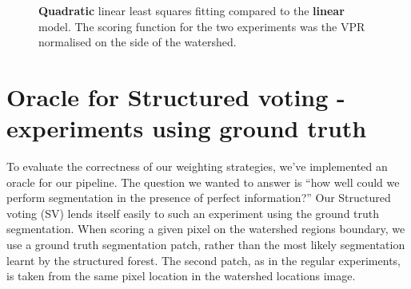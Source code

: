 \begin{figure}[ht!]
\centering
\caption[Quadratic linear least squares fitting compared to the linear model - plots]{{\bf Quadratic} linear least squares fitting compared to the {\bf linear} model. The scoring function for the two experiments was the VPR normalised on the side of the watershed.}
\label{fig:SE-quadratic}
\end{figure}

\section[Oracle for Structured voting]{Oracle for Structured voting - experiments using ground truth}
\label{sec:ch5-oracle}

To evaluate the correctness of our weighting strategies, we've implemented an oracle for our pipeline. The question we wanted to answer is ``how well could we perform segmentation in the presence of perfect information?'' Our Structured voting (SV) lends itself easily to such an experiment using the ground truth segmentation. 
When scoring a given pixel on the watershed regions boundary, we use a ground truth segmentation patch, rather than the most likely segmentation learnt by the structured forest. The second patch, as in the regular experiments, is taken from the same pixel location in the watershed locations image.

